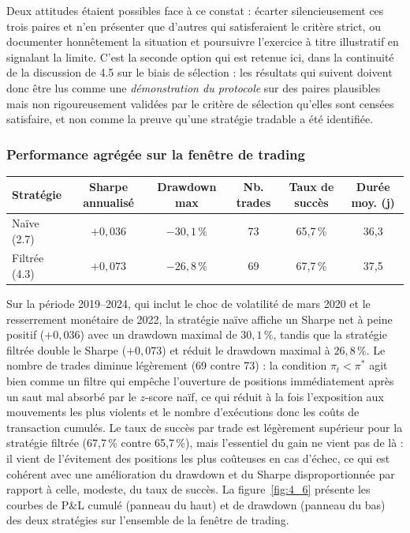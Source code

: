 \documentclass{article}
\begin{document}
Deux attitudes étaient possibles face à ce constat : écarter silencieusement ces trois paires et n'en présenter que d'autres qui satisferaient le critère strict, ou documenter honnêtement la situation et poursuivre l'exercice à titre illustratif en signalant la limite. C'est la seconde option qui est retenue ici, dans la continuité de la discussion de 4.5 sur le biais de sélection : les résultats qui suivent doivent donc être lus comme une \emph{démonstration du protocole} sur des paires plausibles mais non rigoureusement validées par le critère de sélection qu'elles sont censées satisfaire, et non comme la preuve qu'une stratégie tradable a été identifiée.

\subsubsection*{Performance agrégée sur la fenêtre de trading}
\begin{center}
\begin{tabular}{lccccc}
\toprule
Stratégie & Sharpe annualisé & Drawdown max & Nb. trades & Taux de succès & Durée moy. (j) \\
\midrule
Naïve (2.7) & $+0{,}036$ & $-30{,}1\,\%$ & 73 & 65{,}7\,\% & 36{,}3 \\
Filtrée (4.3) & $+0{,}073$ & $-26{,}8\,\%$ & 69 & 67{,}7\,\% & 37{,}5 \\
\bottomrule
\end{tabular}
\end{center}
Sur la période 2019--2024, qui inclut le choc de volatilité de mars 2020 et le resserrement monétaire de 2022, la stratégie naïve affiche un Sharpe net à peine positif ($+0{,}036$) avec un drawdown maximal de $30{,}1\,\%$, tandis que la stratégie filtrée double le Sharpe ($+0{,}073$) et réduit le drawdown maximal à $26{,}8\,\%$. Le nombre de trades diminue légèrement (69 contre 73) : la condition $\pi_t<\pi^\ast$ agit bien comme un filtre qui empêche l'ouverture de positions immédiatement après un saut mal absorbé par le $z$-score naïf, ce qui réduit à la fois l'exposition aux mouvements les plus violents et le nombre d'exécutions donc les coûts de transaction cumulés. Le taux de succès par trade est légèrement supérieur pour la stratégie filtrée (67{,}7\,\% contre 65{,}7\,\%), mais l'essentiel du gain ne vient pas de là : il vient de l'évitement des positions les plus coûteuses en cas d'échec, ce qui est cohérent avec une amélioration du drawdown et du Sharpe disproportionnée par rapport à celle, modeste, du taux de succès.
La figure~\ref{fig:4_6} présente les courbes de P\&L cumulé (panneau du haut) et de drawdown (panneau du bas) des deux stratégies sur l'ensemble de la fenêtre de trading.
\end{document}
